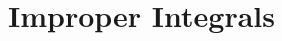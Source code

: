 \section{Improper Integrals} \label{S:6.5.Improper}




\newpage



\newpage



\newpage




\newpage

\clearpage
